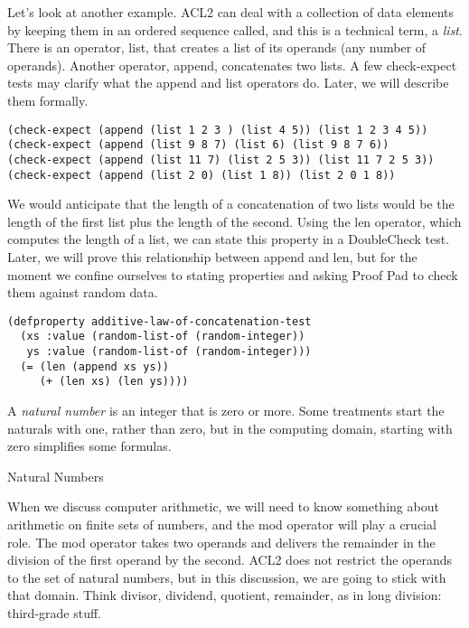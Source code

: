 Let's look at another example.
ACL2 can deal with a collection of data elements
by keeping them in an ordered sequence 
called, and this is a technical term, a 
\emph{list}.
There is an operator,
\label{list-op-informal}\textsf{list},
that creates a list of its operands
(any number of operands).
Another operator,
\label{append-op-informal}\textsf{append},
concatenates two lists.
A few \textsf{check-expect} tests may clarify
what the \textsf{append} and \textsf{list} operators do.
Later, we will describe them formally.

\begin{Verbatim}
(check-expect (append (list 1 2 3 ) (list 4 5)) (list 1 2 3 4 5))
(check-expect (append (list 9 8 7) (list 6) (list 9 8 7 6))
(check-expect (append (list 11 7) (list 2 5 3)) (list 11 7 2 5 3))
(check-expect (append (list 2 0) (list 1 8)) (list 2 0 1 8))
\end{Verbatim}

We would anticipate that the length of a concatenation of two lists
would be the length of the first list plus the length of the second.
Using the
\label{len-op-informal}\textsf{len}
operator, which computes the length of a list,
we can state this property in a DoubleCheck test.
Later, we will prove this relationship between \textsf{append} and \textsf{len},
but for the moment we confine ourselves to stating properties
and asking Proof Pad to check them against random data.

\label{additive-lengths-test}
\begin{Verbatim}
(defproperty additive-law-of-concatenation-test
  (xs :value (random-list-of (random-integer))
   ys :value (random-list-of (random-integer)))
  (= (len (append xs ys))
     (+ (len xs) (len ys))))
\end{Verbatim}

\begin{aside}
A \emph{natural number} is
an integer that is zero or more.
Some treatments start the naturals with one,
rather than zero, but in the computing domain,
starting with zero simplifies some formulas.
\caption{Natural Numbers}
\label{natural-number-def}
\end{aside}

When we discuss computer arithmetic, we will need to know something about
arithmetic on finite sets of numbers,  and the
\label{mod-function}mod
operator will play a crucial role.
The mod operator takes two operands and
delivers the remainder in the division of the first operand by the second.
ACL2 does not restrict the operands to the set of natural numbers,
but in this discussion, we are going to stick with that domain.
Think
divisor, dividend, quotient, remainder,
as in
long division:
third-grade stuff.

